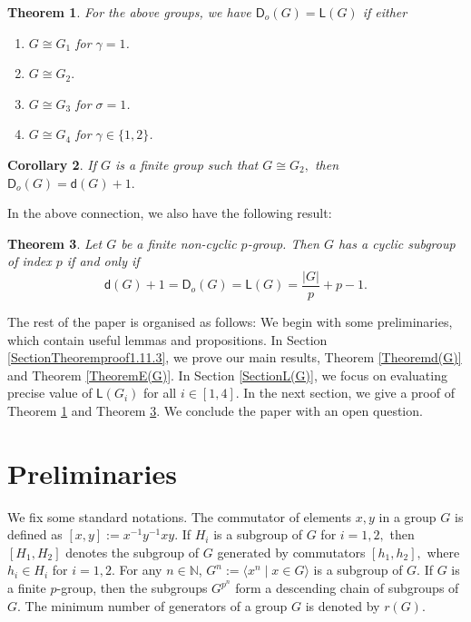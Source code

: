 \documentclass[a4paper,11pt]{article}
\newtheorem{thm}{Theorem}[section]
\numberwithin{equation}{section}
\newtheorem{cor}[thm]{Corollary}
\newcommand{\no}{\noindent}
\begin{document}
\begin{thm}\label{TheoremOrderedLoewy} For the above groups, we have $\mathsf{D}_o(G)=\mathsf{L}(G)$ if either
\begin{enumerate}[label=\emph{(\arabic*)}]
\item  $G\cong G_1$ for $\gamma=1$.  
\item $G\cong G_2.$
\item $G\cong G_3$ for $\sigma=1$.
\item $G\cong G_4$ for $\gamma \in \{1,2\}$.
\end{enumerate}
\end{thm}

\begin{cor}\label{d}
    If $G$ is a finite group such that $G\cong G_2,$ then $\mathsf{D}_o(G)=\mathsf{d}(G)+1.$
\end{cor}
    

\no In the above connection, we also have the following result: 
\begin{thm}\label{LemmaIndexp}
    Let $G$ be a finite non-cyclic $p$-group. Then $G$ has a cyclic subgroup of index $p$ if and only if $$\mathsf{d}(G)+1=\mathsf{D}_o(G)=\mathsf{L}(G)=\frac{|G|}{p}+p-1.$$
     
\end{thm}


\no The rest of the paper is organised as follows: We begin with some preliminaries, which contain useful lemmas and propositions. In Section \ref{SectionTheoremproof1.11.3}, we prove our main results, Theorem \ref{Theoremd(G)} and Theorem \ref{TheoremE(G)}. In Section \ref{SectionL(G)}, we focus on evaluating precise value of $\mathsf{L}(G_i)$ for all $i\in [1,4].$ In the next section, we give a proof of Theorem \ref{TheoremOrderedLoewy} and Theorem \ref{LemmaIndexp}. We conclude the paper with an open question.

\section{Preliminaries}\label{section pre}

\noindent We fix some standard notations. The commutator of elements $x, y$ in a group $G$ is defined as $[x,y]:=x^{-1}y^{-1}xy$. If $H_i$ is a subgroup of $G$ for $i=1,2,$ then $[H_1,H_2]$ denotes the subgroup of $G$ generated by commutators $[h_1,h_2],$ where $h_i \in H_i$ for $i=1,2.$
For any $n\in \mathbb{N}$, $G^{n}:=\langle x^n \mid x\in G \rangle$ is a subgroup of $G.$ If $G$ is a finite $p$-group, then the subgroups $G^{p^n}$ form a descending chain of subgroups of $G$. The minimum number of generators of a group $G$ is denoted by $r(G)$. 
\end{document}
